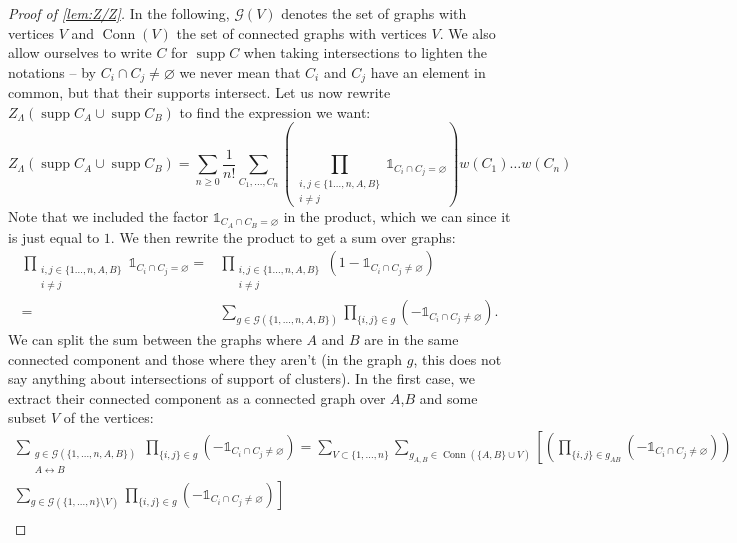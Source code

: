 \documentclass{article}
\DeclareMathOperator{\Conn}{Conn}
\DeclareMathOperator{\supp}{supp}
\begin{document}
 
 \begin{proof}[Proof of \cref{lem:Z/Z}]
     In the following, $\mathcal G(V)$ denotes the set of graphs with vertices $V$ and $\Conn(V)$ the set of connected graphs with vertices $V$.
     We also allow ourselves to write $C$ for $\supp C$ when taking intersections to lighten the notations -- by $C_i\cap C_j \neq \varnothing$ we never mean that $C_i$ and $C_j$ have an element in common, but that their supports intersect.
     Let us now rewrite $Z_\Lambda(\supp C_A\cup \supp C_B)$ to find the expression we want:
     \begin{equation}
         \label{eqn:ZCACB_with_product}
         Z_\Lambda(\supp C_A\cup \supp C_B)=\sum_{n\geq 0}\frac 1{n!}\sum_{C_1,\ldots,C_n}\left(\prod_{\substack{i,j\in \{1\ldots,n,A,B\}\\
                 i\neq j}}\mathbb 1_{C_i\cap C_j=\varnothing}\right)w(C_1)\ldots w(C_n)
     \end{equation}
     Note that we included the factor $\mathbb 1_{C_A\cap C_B=\varnothing}$ in the product, which we can since it is just equal to $1$.
     We then rewrite the product to get a sum over graphs:
     \begin{align*}
         \prod_{\substack{i,j\in \{1\ldots,n,A,B\}\\
                 i\neq j}}\mathbb 1_{C_i\cap C_j=\varnothing}=&\prod_{\substack{i,j\in \{1\ldots,n,A,B\}\\
                 i\neq j}}(1-\mathbb 1_{C_i\cap C_j\neq\varnothing})\\
         =&\sum_{g \in \mathcal G(\{1,\ldots,n,A,B\})}\prod_{\{i,j\}\in g}(-\mathbb 1_{C_i\cap C_j\neq \varnothing}).
     \end{align*}
     We can split the sum between the graphs where $A$ and $B$ are in the same connected component and those where they aren’t (in the graph $g$, this does not say anything about intersections of support of clusters).
     In the first case, we extract their connected component as a connected graph over $A$,$B$ and some subset $V$ of the vertices:
     \begin{align*}
         \sum_{\substack{g \in\mathcal G (\{1,\ldots,n,A,B\})\\A\leftrightarrow B}}\prod_{\{i,j\}\in g}(-\mathbb 1_{C_i\cap C_j\neq\varnothing})=\sum_{V\subset \{1,\ldots,n\}}\sum_{g_{A,B}\in\Conn(\{A,B\}\cup V)}\left[ \left(\prod_{\{i,j\}\in g_{AB}}(-\mathbb 1_{C_i\cap C_j\neq \varnothing})\right)\right. &\\
         \left. \sum_{g\in \mathcal G(\{1,\ldots,n\}\setminus V)}\prod_{\{i,j\}\in g}(-\mathbb 1_{C_i\cap C_j\neq\varnothing})\right]&\\

\end{align*}
\end{proof}
\end{document}
